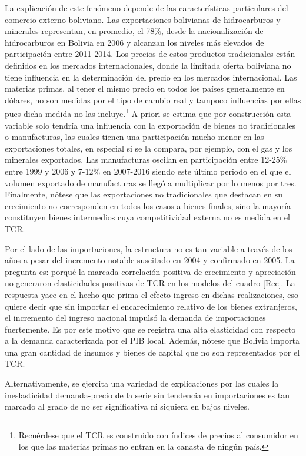 \documentclass[12pt,letterpaper]{article}
\begin{document}
La explicación de este fenómeno depende de las características particulares del comercio externo boliviano. Las exportaciones bolivianas de hidrocarburos y minerales representan, en promedio, el 78\%, desde la nacionalización de hidrocarburos en Bolivia en 2006 y alcanzan los niveles más elevados de participación entre 2011-2014. Los precios de estos productos tradicionales están definidos en los mercados internacionales, donde la limitada oferta boliviana no tiene influencia en la determinación del precio en los mercados internacional. Las materias primas, al tener el mismo precio en todos los países generalmente en dólares, no son medidas por el tipo de cambio real y tampoco influencias por ellas pues dicha medida no las incluye.\footnote{Recuérdese que el TCR es construido con índices de precios al consumidor en los que las materias primas no entran en la canasta de ningún país.} A priori se estima que por construcción esta variable solo tendría una influencia con la exportación de bienes no tradicionales o manufacturas, las cuales tienen una participación mucho menor en las exportaciones totales, en especial si se la compara, por ejemplo, con el gas y los minerales exportados. Las manufacturas oscilan en participación entre 12-25\% entre 1999 y 2006 y 7-12\% en 2007-2016 siendo este último periodo en el que el volumen exportado de manufacturas se llegó a multiplicar por lo menos por tres. Finalmente, nótese que las exportaciones no tradicionales que destacan en su crecimiento no corresponden en todos los casos a bienes finales, sino la mayoría constituyen bienes intermedios cuya competitividad externa no es medida en el TCR.

Por el lado de las importaciones, la estructura no es tan variable a través de los años a pesar del incremento notable suscitado en 2004 y confirmado en 2005. La pregunta es: porqué la marcada correlación positiva de crecimiento y apreciación no generaron elasticidades positivas de TCR en los modelos del cuadro \ref{Rec}. La respuesta yace en el hecho que prima el efecto ingreso en dichas realizaciones, eso quiere decir que sin importar el encarecimiento relativo de los bienes extranjeros, el incremento del ingreso nacional impulsó la demanda de importaciones fuertemente. Es por este motivo que se registra una alta elasticidad con respecto a la demanda caracterizada por el PIB local. Además, nótese que Bolivia importa una gran cantidad de insumos y bienes de capital que no son representados por el TCR. 

Alternativamente, se ejercita una variedad de explicaciones por las cuales la ineslasticidad demanda-precio de la serie sin tendencia en importaciones es tan marcado al grado de no ser significativa ni siquiera en bajos niveles.
\end{document}
